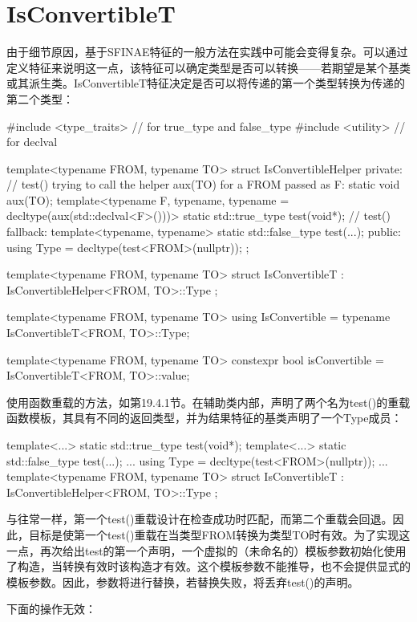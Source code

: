 \section{IsConvertibleT}
由于细节原因，基于SFINAE特征的一般方法在实践中可能会变得复杂。可以通过定义特征来说明这一点，该特征可以确定类型是否可以转换——若期望是某个基类或其派生类。IsConvertibleT特征决定是否可以将传递的第一个类型转换为传递的第二个类型：

\begin{cpp}
#include <type_traits> // for true_type and false_type
#include <utility> // for declval

template<typename FROM, typename TO>
struct IsConvertibleHelper {
	private:
	// test() trying to call the helper aux(TO) for a FROM passed as F:
		static void aux(TO);
	template<typename F, typename,
	typename = decltype(aux(std::declval<F>()))>
		static std::true_type test(void*);
	// test() fallback:
	template<typename, typename>
		static std::false_type test(...);
	public:
	using Type = decltype(test<FROM>(nullptr));
};

template<typename FROM, typename TO>
struct IsConvertibleT : IsConvertibleHelper<FROM, TO>::Type {
};

template<typename FROM, typename TO>
using IsConvertible = typename IsConvertibleT<FROM, TO>::Type;

template<typename FROM, typename TO>
constexpr bool isConvertible = IsConvertibleT<FROM, TO>::value;
\end{cpp}

使用函数重载的方法，如第19.4.1节。在辅助类内部，声明了两个名为test()的重载函数模板，其具有不同的返回类型，并为结果特征的基类声明了一个Type成员：

\begin{cpp}
template<...> static std::true_type test(void*);
template<...> static std::false_type test(...);
...
using Type = decltype(test<FROM>(nullptr));
...
template<typename FROM, typename TO>
struct IsConvertibleT : IsConvertibleHelper<FROM, TO>::Type {
};
\end{cpp}

与往常一样，第一个test()重载设计在检查成功时匹配，而第二个重载会回退。因此，目标是使第一个test()重载在当类型FROM转换为类型TO时有效。为了实现这一点，再次给出test的第一个声明，一个虚拟的（未命名的）模板参数初始化使用了构造，当转换有效时该构造才有效。这个模板参数不能推导，也不会提供显式的模板参数。因此，参数将进行替换，若替换失败，将丢弃test()的声明。

下面的操作无效：

